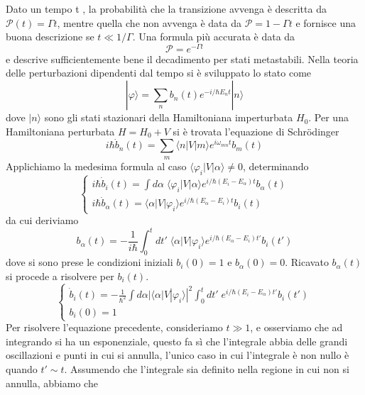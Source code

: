 Dato un tempo t , la probabilit\`a che la transizione avvenga \`e descritta da $\mathcal{P}(t) = \Gamma t$, mentre quella che non avvenga \`e data da $\mathcal{P} = 1-\Gamma t$ e fornisce una buona descrizione se $t \ll 1/\Gamma$. Una formula pi\`u accurata \`e data da
\begin{equation*}
	\mathcal{P} = e^{-\Gamma t}
\end{equation*} 
e descrive sufficientemente bene il decadimento per stati metastabili.
\newpage
Nella teoria delle perturbazioni dipendenti dal tempo si \`e sviluppato lo stato come 
\begin{equation*}
	|\varphi \rangle = \sum_{n}b_n(t)e^{-i/\hbar E_n t}|n\rangle 
\end{equation*}
dove $|n \rangle$ sono gli stati stazionari della Hamiltoniana imperturbata $H_0$. Per una Hamiltoniana perturbata $H = H_0 + V$ si \`e trovata l'equazione di Schr\"odinger 
\begin{equation*}
	i\hbar \dot{b}_{n}(t) = \sum_{m} \langle n | V | m \rangle e^{i\omega_{mn}t}b_m(t)
\end{equation*}
Applichiamo la medesima formula al caso $\langle \varphi_i |V|\alpha \rangle \neq 0$, determinando
\begin{equation*}
	\left \{ \begin{array}{l}
		i \hbar \dot{b}_i(t) = \int d\alpha \; \langle \varphi_i |V|\alpha \rangle e^{i/\hbar (E_i-E_{\alpha})t}b_{\alpha}(t) \\[0.4cm]
		i \hbar \dot{b}_{\alpha}(t) = \langle \alpha |V|\varphi_i \rangle e^{i/\hbar (E_{\alpha}-E_i)t}b_i(t) 
	\end{array}\right.
\end{equation*}
da cui deriviamo
\begin{equation*}
	b_{\alpha}(t) = - \frac{1}{i \hbar} \int_{0}^{t} dt' \; \langle \alpha |V|\varphi_i \rangle e^{i/\hbar(E_\alpha - E_i)t'}b_i(t')
\end{equation*}
dove si sono prese le condizioni iniziali $b_i(0)=1$ e $b_{\alpha}(0) = 0$. Ricavato $b_\alpha (t)$ si procede a risolvere per $b_i(t)$.
\begin{equation*}
	\left \{ \begin{array}{l}
		\dot{b}_i(t) = - \frac{1}{\hbar^2} \int d\alpha |\langle \alpha |V|\varphi_i \rangle|^2 \int_0^t dt' \; e^{i/\hbar(E_i-E_{\alpha})t'}b_i(t') \\[0.4cm]
		b_i(0) =1
	\end{array}\right.
\end{equation*}
Per risolvere l'equazione precedente, consideriamo $t \gg 1$, e osserviamo che ad integrando si ha un esponenziale, questo fa s\`i che l'integrale abbia delle grandi oscillazioni e punti in cui si annulla, l'unico caso in cui l'integrale \`e non nullo \`e quando $t' \sim t$. Assumendo che l'integrale sia definito nella regione in cui non si annulla, abbiamo che 
